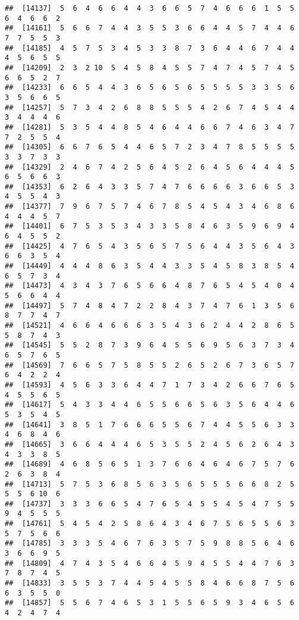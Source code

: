 \documentclass[
]{book}
\begin{document}
\begin{verbatim}
##  [14137]  5  6  4  6  6  4  4  3  6  6  5  7  4  6  6  6  1  5  5  6  4  6  6  2
##  [14161]  5  6  6  7  4  4  3  5  5  3  6  6  4  4  5  7  4  4  6  7  7  5  5  3
##  [14185]  4  5  7  5  3  4  5  3  3  8  7  3  6  4  4  6  7  4  4  4  5  6  5  5
##  [14209]  2  3  2 10  5  4  5  8  4  5  5  7  4  7  4  5  7  4  5  6  6  5  2  7
##  [14233]  6  6  5  4  4  3  6  5  6  5  6  5  5  5  5  3  3  5  6  3  5  6  6  5
##  [14257]  5  7  3  4  2  6  8  8  5  5  5  4  2  6  7  4  5  4  4  3  4  4  4  6
##  [14281]  5  3  5  4  4  8  5  4  6  4  4  6  6  7  4  6  3  4  7  7  2  5  5  4
##  [14305]  6  6  7  6  5  4  4  6  5  7  2  3  4  7  8  5  5  5  5  3  3  7  3  3
##  [14329]  2  4  6  7  4  2  5  6  4  5  2  6  4  5  6  4  4  4  5  6  5  6  6  3
##  [14353]  6  2  6  4  3  3  5  7  4  7  6  6  6  6  3  6  6  5  3  4  5  5  4  3
##  [14377]  7  9  6  7  5  7  4  6  7  8  5  4  5  4  3  4  6  8  6  4  4  4  5  7
##  [14401]  6  7  5  3  5  3  4  3  3  5  8  4  6  3  5  9  6  9  4  6  4  5  5  2
##  [14425]  4  7  6  5  4  3  5  6  5  7  5  6  4  4  3  5  6  4  3  6  6  3  5  4
##  [14449]  4  4  4  8  6  3  5  4  4  3  3  5  4  5  8  3  8  5  4  6  5  7  3  4
##  [14473]  4  3  4  3  7  6  5  6  6  4  8  7  6  5  4  5  4  0  4  5  6  6  4  4
##  [14497]  5  7  4  8  4  7  2  2  8  4  3  7  4  7  6  1  3  5  6  8  7  7  4  7
##  [14521]  4  6  6  4  6  6  6  3  5  4  3  6  2  4  4  2  8  6  5  5  8  7  4  3
##  [14545]  5  5  2  8  7  3  9  6  4  5  5  6  9  5  6  3  7  3  4  6  5  7  6  5
##  [14569]  7  6  6  5  7  5  8  5  5  2  6  5  2  6  7  3  6  5  7  6  4  2  2  4
##  [14593]  4  5  6  3  3  6  4  4  7  1  7  3  4  2  6  6  7  6  5  4  5  5  6  5
##  [14617]  5  4  3  3  4  4  6  5  5  6  6  5  6  3  5  6  4  4  6  5  3  5  4  5
##  [14641]  3  8  5  1  7  6  6  6  5  5  6  7  4  4  5  5  6  3  3  4  6  8  4  6
##  [14665]  3  6  6  4  4  4  6  5  3  5  5  2  4  5  6  2  6  4  3  4  3  3  8  5
##  [14689]  4  6  8  5  6  5  1  3  7  6  6  4  6  4  6  7  5  7  6  2  6  3  8  4
##  [14713]  5  7  5  3  6  8  5  6  3  5  6  5  5  5  6  6  8  2  5  5  5  6 10  6
##  [14737]  3  3  3  6  6  5  4  7  6  5  4  5  5  4  5  4  7  5  5  9  4  5  5  5
##  [14761]  5  4  5  4  2  5  8  6  4  3  4  6  7  5  6  5  5  6  3  5  7  5  6  6
##  [14785]  3  3  3  5  4  6  7  6  3  5  7  5  9  8  8  5  6  4  6  3  6  6  9  5
##  [14809]  4  7  4  3  5  4  6  6  4  5  9  4  5  5  4  4  7  6  3  7  8  7  4  5
##  [14833]  3  5  5  3  7  4  4  5  4  5  5  8  4  6  6  8  7  5  6  6  3  5  5  0
##  [14857]  5  5  6  7  4  6  5  3  1  5  5  6  5  9  3  4  6  5  6  4  2  4  7  4

\end{verbatim}
\end{document}
